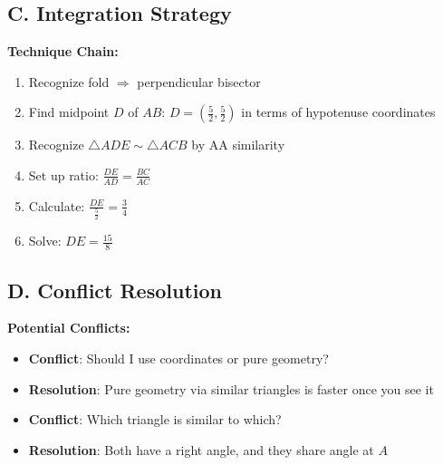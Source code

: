 \documentclass[12pt]{article}
\begin{document}
\begin{conversionbox}
\subsection*{C. Integration Strategy}

\textbf{Technique Chain:}
\begin{enumerate}
    \item Recognize fold $\Rightarrow$ perpendicular bisector
    \item Find midpoint $D$ of $AB$: $D = (\frac{5}{2}, \frac{5}{2})$ in terms of hypotenuse coordinates
    \item Recognize $\triangle ADE \sim \triangle ACB$ by AA similarity
    \item Set up ratio: $\frac{DE}{AD} = \frac{BC}{AC}$
    \item Calculate: $\frac{DE}{\frac{5}{2}} = \frac{3}{4}$
    \item Solve: $DE = \frac{15}{8}$
\end{enumerate}

\subsection*{D. Conflict Resolution}

\textbf{Potential Conflicts:}
\begin{itemize}
    \item \textbf{Conflict}: Should I use coordinates or pure geometry?
    \item \textbf{Resolution}: Pure geometry via similar triangles is faster once you see it
    \item \textbf{Conflict}: Which triangle is similar to which?
    \item \textbf{Resolution}: Both have a right angle, and they share angle at $A$
\end{itemize}
\end{conversionbox}
\end{document}
